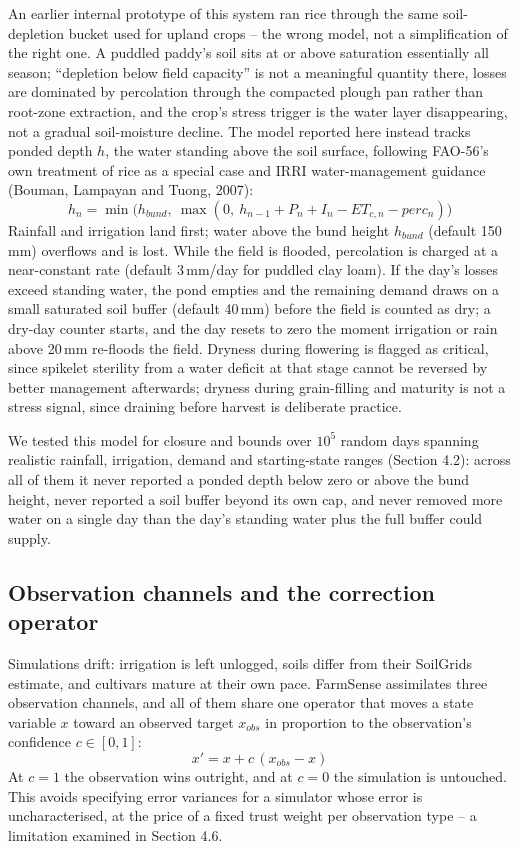 \documentclass[11pt,a4paper]{article}
\begin{document}
An earlier internal prototype of this system ran rice through the same soil-depletion bucket used for upland crops -- the wrong model, not a simplification of the right one. A puddled paddy's soil sits at or above saturation essentially all season; ``depletion below field capacity'' is not a meaningful quantity there, losses are dominated by percolation through the compacted plough pan rather than root-zone extraction, and the crop's stress trigger is the water layer disappearing, not a gradual soil-moisture decline. The model reported here instead tracks ponded depth $h$, the water standing above the soil surface, following FAO-56's own treatment of rice as a special case and IRRI water-management guidance (Bouman, Lampayan and Tuong, 2007):
\begin{equation}
h_{n} = \min\!\big(h_{bund},\ \max(0,\ h_{n-1} + P_n + I_n - ET_{c,n} - perc_n)\big)
\end{equation}
Rainfall and irrigation land first; water above the bund height $h_{bund}$ (default 150\,mm) overflows and is lost. While the field is flooded, percolation is charged at a near-constant rate (default 3\,mm/day for puddled clay loam). If the day's losses exceed standing water, the pond empties and the remaining demand draws on a small saturated soil buffer (default 40\,mm) before the field is counted as dry; a dry-day counter starts, and the day resets to zero the moment irrigation or rain above 20\,mm re-floods the field. Dryness during flowering is flagged as critical, since spikelet sterility from a water deficit at that stage cannot be reversed by better management afterwards; dryness during grain-filling and maturity is not a stress signal, since draining before harvest is deliberate practice.

We tested this model for closure and bounds over $10^5$ random days spanning realistic rainfall, irrigation, demand and starting-state ranges (Section 4.2): across all of them it never reported a ponded depth below zero or above the bund height, never reported a soil buffer beyond its own cap, and never removed more water on a single day than the day's standing water plus the full buffer could supply.

\subsection{Observation channels and the correction operator}

Simulations drift: irrigation is left unlogged, soils differ from their SoilGrids estimate, and cultivars mature at their own pace. FarmSense assimilates three observation channels, and all of them share one operator that moves a state variable $x$ toward an observed target $x_{obs}$ in proportion to the observation's confidence $c \in [0,1]$:
\begin{equation}
x' = x + c\,(x_{obs} - x)
\end{equation}
At $c=1$ the observation wins outright, and at $c=0$ the simulation is untouched. This avoids specifying error variances for a simulator whose error is uncharacterised, at the price of a fixed trust weight per observation type -- a limitation examined in Section 4.6.
\end{document}
